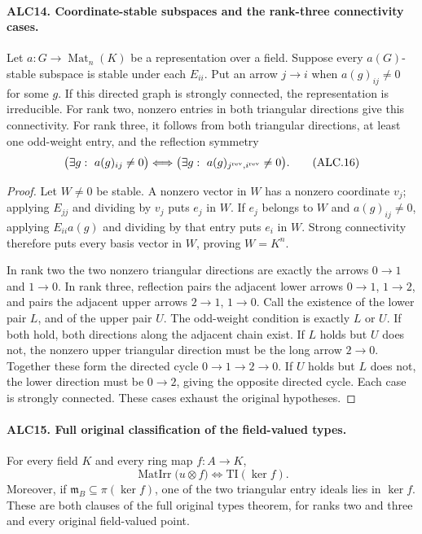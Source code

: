 \paragraph{ALC14. Coordinate-stable subspaces and the rank-three connectivity cases.}
\label{claim:ALC14}
Let \(a:G\to\operatorname{Mat}_n(K)\) be a representation
over a field.  Suppose every \(a(G)\)-stable subspace is
stable under each \(E_{ii}\).  Put an arrow \(j\to i\)
when \(a(g)_{ij}\ne0\) for some \(g\).  If this directed
graph is strongly connected, the representation is irreducible.
For rank two, nonzero entries in both triangular directions
give this connectivity.  For rank three, it follows from
both triangular directions, at least one odd-weight entry,
and the reflection symmetry
\[
 \bigl(\exists g:\ a(g)_{ij}\ne0\bigr)
 \Longleftrightarrow
 \bigl(\exists g:\ a(g)_{j^{\rm rev},i^{\rm rev}}\ne0\bigr).
                                                        \tag{ALC.16}
\]

\begin{proof}
Let \(W\ne0\) be stable.  A nonzero vector in \(W\) has
a nonzero coordinate \(v_j\); applying \(E_{jj}\) and
dividing by \(v_j\) puts \(e_j\) in \(W\).  If \(e_j\)
belongs to \(W\) and \(a(g)_{ij}\ne0\), applying
\(E_{ii}a(g)\) and dividing by that entry puts \(e_i\)
in \(W\).  Strong connectivity therefore puts every basis
vector in \(W\), proving \(W=K^n\).

In rank two the two nonzero triangular directions are exactly
the arrows \(0\to1\) and \(1\to0\).
In rank three, reflection pairs the adjacent lower arrows
\(0\to1\), \(1\to2\), and pairs the adjacent upper
arrows \(2\to1\), \(1\to0\).  Call the existence of
the lower pair \(L\), and of the upper pair \(U\).
The odd-weight condition is exactly \(L\) or \(U\).
If both hold, both directions along the adjacent chain exist.
If \(L\) holds but \(U\) does not, the nonzero upper
triangular direction must be the long arrow \(2\to0\).
Together these form the directed cycle
\(0\to1\to2\to0\).  If \(U\) holds but \(L\) does
not, the lower direction must be \(0\to2\), giving the
opposite directed cycle.  Each case is strongly connected.
These cases exhaust the original hypotheses.
\end{proof}

\paragraph{ALC15. Full original classification of the field-valued types.}
\label{claim:ALC15}
For every field \(K\) and every ring map \(f:A\to K\),
\[
 \operatorname{MatIrr}\bigl(u\otimes f\bigr)
       \Longleftrightarrow \mathrm{TI}(\ker f).
                                                        \tag{ALC.17}
\]
Moreover, if \(\mathfrak m_B\subseteq\pi(\ker f)\),
one of the two triangular entry ideals lies in \(\ker f\).
These are both clauses of the full original
\(\mathrm{types}\) theorem, for ranks two and three and
every original field-valued point.

